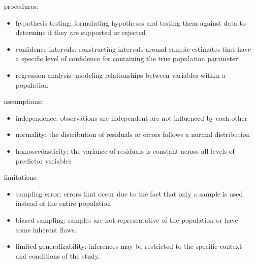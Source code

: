 \documentclass{article}
\begin{document}
procedures:
	\begin{itemize}
		\item hypothesis testing: formulating hypotheses and testing them against data to determine if they are supported or rejected
		\item confidence intervals: constructing intervals around sample estimates that have a specific level of confidence for containing the true population parameter
		\item regression analysis: modeling relationships between variables within a population
	\end{itemize}

assumptions:
	\begin{itemize}
		\item independence: observations are independent are not influenced by each other
		\item normality: the distribution of residuals or errors follows a normal distribution
		\item homoscedasticity: the variance of residuals is constant across all levels of predictor variables
	\end{itemize}

limitations:
	\begin{itemize}
		\item sampling error: errors that occur due to the fact that only a sample is used instead of the entire population
		\item biased sampling: samples are not representative of the population or have some inherent flaws.
		\item limited generalizability: inferences may be restricted to the specific context and conditions of the study.
	\end{itemize}
\end{document}
